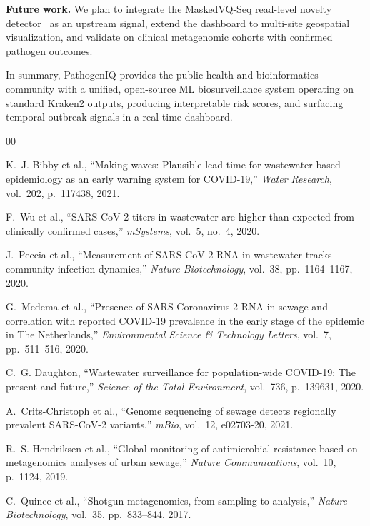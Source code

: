 \documentclass[conference]{IEEEtran}
\begin{document}
\textbf{Future work.} We plan to integrate the MaskedVQ-Seq
read-level novelty detector~\cite{Azumah2026} as an upstream signal,
extend the dashboard to multi-site geospatial visualization, and validate
on clinical metagenomic cohorts with confirmed pathogen outcomes.

In summary, PathogenIQ provides the public health and bioinformatics
community with a unified, open-source ML biosurveillance system operating
on standard Kraken2 outputs, producing interpretable risk scores, and
surfacing temporal outbreak signals in a real-time dashboard.

\begin{thebibliography}{00}

K.~J. Bibby et al., ``Making waves: Plausible lead time for wastewater based
epidemiology as an early warning system for COVID-19,''
\textit{Water Research}, vol.~202, p.~117438, 2021.

F.~Wu et al., ``SARS-CoV-2 titers in wastewater are higher than expected
from clinically confirmed cases,'' \textit{mSystems}, vol.~5, no.~4, 2020.

J.~Peccia et al., ``Measurement of SARS-CoV-2 RNA in wastewater tracks
community infection dynamics,''
\textit{Nature Biotechnology}, vol.~38, pp.~1164--1167, 2020.

G.~Medema et al., ``Presence of SARS-Coronavirus-2 RNA in sewage and
correlation with reported COVID-19 prevalence in the early stage of the
epidemic in The Netherlands,''
\textit{Environmental Science \& Technology Letters}, vol.~7, pp.~511--516, 2020.

C.~G. Daughton, ``Wastewater surveillance for population-wide COVID-19:
The present and future,''
\textit{Science of the Total Environment}, vol.~736, p.~139631, 2020.

A.~Crits-Christoph et al., ``Genome sequencing of sewage detects regionally
prevalent SARS-CoV-2 variants,'' \textit{mBio}, vol.~12, e02703-20, 2021.

R.~S. Hendriksen et al., ``Global monitoring of antimicrobial resistance
based on metagenomics analyses of urban sewage,''
\textit{Nature Communications}, vol.~10, p.~1124, 2019.

C.~Quince et al., ``Shotgun metagenomics, from sampling to analysis,''
\textit{Nature Biotechnology}, vol.~35, pp.~833--844, 2017.


\end{thebibliography}
\end{document}
